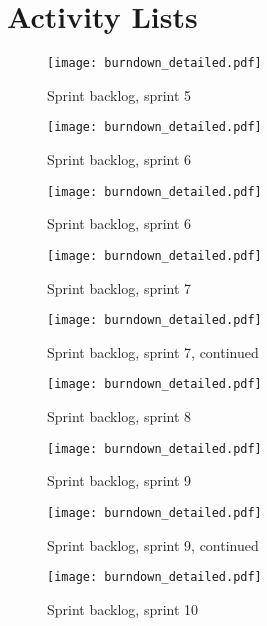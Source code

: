 \section{Activity Lists}

\begin{figure}[h!]
	\texttt{[image: burndown\_detailed.pdf]}
	\caption{Sprint backlog, sprint 5}
	\end{figure}

\begin{figure}[h!]
    \centering
	\texttt{[image: burndown\_detailed.pdf]}
	\caption{Sprint backlog, sprint 6}
	\end{figure}


\begin{figure}[h!]
    \centering
	\texttt{[image: burndown\_detailed.pdf]}
	\caption{Sprint backlog, sprint 6}
	\end{figure}


\begin{figure}[h!]
    \centering
	\texttt{[image: burndown\_detailed.pdf]}
	\caption{Sprint backlog, sprint 7}
	\end{figure}

\begin{figure}[h!]
    \centering
	\texttt{[image: burndown\_detailed.pdf]}
	\caption{Sprint backlog, sprint 7, continued}
	\end{figure}


\begin{figure}[h!]
    \centering
	\texttt{[image: burndown\_detailed.pdf]}
	\caption{Sprint backlog, sprint 8}
	\end{figure}


\begin{figure}[h!]
    \centering
	\texttt{[image: burndown\_detailed.pdf]}
	\caption{Sprint backlog, sprint 9}
	\end{figure}


\begin{figure}[h!]
    \centering
	\texttt{[image: burndown\_detailed.pdf]}
	\caption{Sprint backlog, sprint 9, continued}
	\end{figure}


\begin{figure}[h!]
    \centering
	\texttt{[image: burndown\_detailed.pdf]}
	\caption{Sprint backlog, sprint 10}
	\end{figure}

